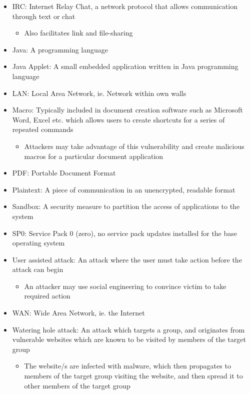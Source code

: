 \begin{itemize}
\item IRC: Internet Relay Chat, a network protocol that allows communication through text or chat
	\begin{itemize}
	\item Also facilitates link and file-sharing
	\end{itemize}
\item Java: A programming language
\item Java Applet: A small embedded application written in Java programming language
\item LAN: Local Area Network, ie. Network within own walls
\item Macro: Typically included in document creation software such as Microsoft Word, Excel etc. which allows users to create shortcuts for a series of repeated commands
	\begin{itemize}
	\item Attackers may take advantage of this vulnerability and create malicious macros for a particular document application
	\end{itemize}
\item PDF: Portable Document Format
\item Plaintext: A piece of communication in an unencrypted, readable format
\item Sandbox: A security measure to partition the access of applications to the system
\item SP0: Service Pack 0 (zero), no service pack updates installed for the base operating system
\item User assisted attack: An attack where the user must take action before the attack can begin
	\begin{itemize}
	\item An attacker may use social engineering to convince victim to take required action
	\end{itemize}
\item WAN: Wide Area Network, ie. the Internet
\item Watering hole attack: An attack which targets a group, and originates from vulnerable websites which are known to be visited by members of the target group \citep{Krebs2012, Mimoso2013}
	\begin{itemize}
	\item The website/s are infected with malware, which then propagates to members of the target group visiting the website, and then spread it to other members of the target group
	\end{itemize}
\end{itemize}